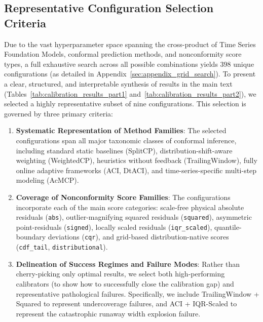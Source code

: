 \documentclass[12pt, a4paper]{article}
\begin{document}
\subsection{Representative Configuration Selection Criteria}
Due to the vast hyperparameter space spanning the cross-product of Time Series Foundation Models, conformal prediction methods, and nonconformity score types, a full exhaustive search across all possible combinations yields \(398\) unique configurations (as detailed in Appendix~\ref{sec:appendix_grid_search}). To present a clear, structured, and interpretable synthesis of results in the main text (Tables~\ref{tab:calibration_results_part1} and~\ref{tab:calibration_results_part2}), we selected a highly representative subset of nine configurations. This selection is governed by three primary criteria:

\begin{enumerate}
	\item \textbf{Systematic Representation of Method Families}: The selected configurations span all major taxonomic classes of conformal inference, including standard static baselines (SplitCP), distribution-shift-aware weighting (WeightedCP), heuristics without feedback (TrailingWindow), fully online adaptive frameworks (ACI, DtACI), and time-series-specific multi-step modeling (AcMCP).
	\item \textbf{Coverage of Nonconformity Score Families}: The configurations incorporate each of the main score categories: scale-free physical absolute residuals (\texttt{abs}), outlier-magnifying squared residuals (\texttt{squared}), asymmetric point-residuals (\texttt{signed}), locally scaled residuals (\texttt{iqr\_scaled}), quantile-boundary deviations (\texttt{cqr}), and grid-based distribution-native scores (\texttt{cdf\_tail}, \texttt{distributional}).
	\item \textbf{Delineation of Success Regimes and Failure Modes}: Rather than cherry-picking only optimal results, we select both high-performing calibrators (to show how to successfully close the calibration gap) and representative pathological failures. Specifically, we include TrailingWindow + Squared to represent undercoverage failures, and ACI + IQR-Scaled to represent the catastrophic runaway width explosion failure.
\end{enumerate}
\end{document}
